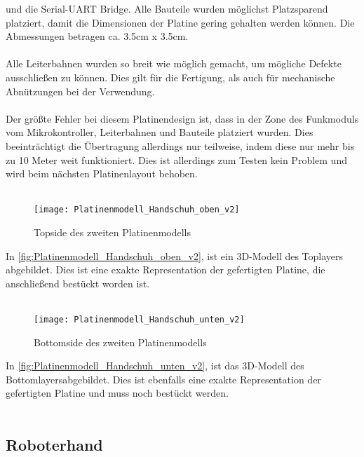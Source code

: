 \documentclass[titlepage,12pt,twoside]{article}
\begin{document}
und die Serial-UART Bridge. Alle Bauteile wurden möglichst Platzsparend platziert, damit die Dimensionen der Platine gering gehalten werden können.
Die Abmessungen betragen ca. 3.5cm x 3.5cm. \\
\\
Alle Leiterbahnen wurden so breit wie möglich gemacht, um mögliche Defekte ausschließen zu können. Dies gilt für die Fertigung, als auch für mechanische
Abnützungen bei der Verwendung. \\
\\
Der größte Fehler bei diesem Platinendesign ist, dass in der Zone des Funkmoduls vom Mikrokontroller, Leiterbahnen und Bauteile platziert wurden.
Dies beeinträchtigt die Übertragung allerdings nur teilweise, indem diese nur mehr bis zu 10 Meter weit funktioniert. Dies ist allerdings zum Testen
kein Problem und wird beim nächsten Platinenlayout behoben. \\
\\
\begin{figure}[H]
	\begin{center}
		\scalebox{0.8}
		{\texttt{[image: Platinenmodell\_Handschuh\_oben\_v2]}}
		\caption{Topside des zweiten Platinenmodells}
		\label{fig:Platinenmodell_Handschuh_oben_v2}		
	\end{center}
\end{figure}
\hfill \break
In \autoref{fig:Platinenmodell_Handschuh_oben_v2}, ist ein 3D-Modell des Toplayers abgebildet. Dies ist eine exakte Representation der gefertigten
Platine, die anschließend bestückt worden ist. \\
\\
\begin{figure}[H]
	\begin{center}
		\scalebox{0.8}
		{\texttt{[image: Platinenmodell\_Handschuh\_unten\_v2]}}
		\caption{Bottomside des zweiten Platinenmodells}
		\label{fig:Platinenmodell_Handschuh_unten_v2}		
	\end{center}
\end{figure}
\hfill \break
In \autoref{fig:Platinenmodell_Handschuh_unten_v2}, ist das 3D-Modell des Bottomlayersabgebildet. Dies ist ebenfalls eine exakte Representation der
gefertigten Platine und muss noch bestückt werden. \\
\\

\newpage
\subsection{Roboterhand}
\end{document}
